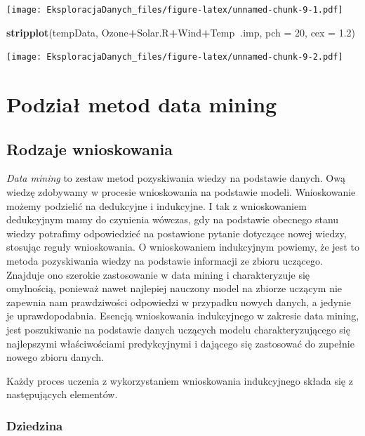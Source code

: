 \documentclass[]{book}
\newenvironment{Shaded}{\begin{snugshade}}{\end{snugshade}}
\newcommand{\DataTypeTok}[1]{\textcolor[rgb]{0.13,0.29,0.53}{#1}}
\newcommand{\DecValTok}[1]{\textcolor[rgb]{0.00,0.00,0.81}{#1}}
\newcommand{\FloatTok}[1]{\textcolor[rgb]{0.00,0.00,0.81}{#1}}
\newcommand{\KeywordTok}[1]{\textcolor[rgb]{0.13,0.29,0.53}{\textbf{#1}}}
\newcommand{\NormalTok}[1]{#1}
\newcommand{\OperatorTok}[1]{\textcolor[rgb]{0.81,0.36,0.00}{\textbf{#1}}}
\theoremstyle{plain}
\theoremstyle{definition}
\begin{document}
\texttt{[image: EksploracjaDanych\_files/figure-latex/unnamed-chunk-9-1.pdf]}

\begin{Shaded}
\begin{Highlighting}[]
\KeywordTok{stripplot}\NormalTok{(tempData, Ozone}\OperatorTok{+}\NormalTok{Solar.R}\OperatorTok{+}\NormalTok{Wind}\OperatorTok{+}\NormalTok{Temp}\OperatorTok{~}\NormalTok{.imp, }\DataTypeTok{pch =} \DecValTok{20}\NormalTok{, }\DataTypeTok{cex =} \FloatTok{1.2}\NormalTok{)}
\end{Highlighting}
\end{Shaded}

\texttt{[image: EksploracjaDanych\_files/figure-latex/unnamed-chunk-9-2.pdf]}

\hypertarget{podzia-metod-data-mining}{%
\chapter{Podział metod data mining}\label{podzia-metod-data-mining}}

\hypertarget{rodzaje-wnioskowania}{%
\section{Rodzaje wnioskowania}\label{rodzaje-wnioskowania}}

\emph{Data mining} to zestaw metod pozyskiwania wiedzy na podstawie danych. Ową wiedzę zdobywamy w procesie wnioskowania na podstawie modeli. Wnioskowanie możemy podzielić na dedukcyjne i indukcyjne. I tak z wnioskowaniem dedukcyjnym mamy do czynienia wówczas, gdy na podstawie obecnego stanu wiedzy potrafimy odpowiedzieć na postawione pytanie dotyczące nowej wiedzy, stosując reguły wnioskowania. O wnioskowaniem indukcyjnym powiemy, że jest to metoda pozyskiwania wiedzy na podstawie informacji ze zbioru uczącego. Znajduje ono szerokie zastosowanie w data mining i charakteryzuje się omylnością, ponieważ nawet najlepiej nauczony model na zbiorze uczącym nie zapewnia nam prawdziwości odpowiedzi w przypadku nowych danych, a jedynie je uprawdopodabnia. Esencją wnioskowania indukcyjnego w zakresie data mining, jest poszukiwanie na podstawie danych uczących modelu charakteryzującego się najlepszymi właściwościami predykcyjnymi i dającego się zastosować do zupełnie nowego zbioru danych.

Każdy proces uczenia z wykorzystaniem wnioskowania indukcyjnego składa się z następujących elementów.

\hypertarget{dziedzina}{%
\subsection{Dziedzina}\label{dziedzina}}
\end{document}
